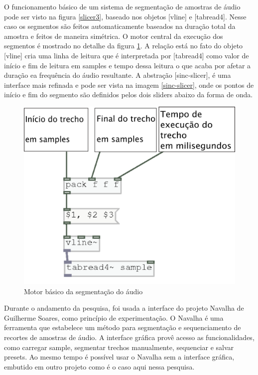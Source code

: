 \documentclass{ppgmus}
\begin{document}
O funcionamento básico de um sistema de segmentação de amostras de áudio pode ser visto na figura \ref{slicer3},
baseado nos objetos [vline\texttildelow] e [tabread4\texttildelow]. Nesse caso os segmentos são feitos
automaticamente baseados na duração total da amostra e feitos de maneira simétrica.
O motor central da execução dos segmentos é mostrado no detalhe da figura \ref{slice-motor}.
A relação está no fato do objeto [vline\texttildelow] cria uma linha de leitura que é interpretada
por [tabread4\texttildelow] como valor de início e fim de leitura em samples e tempo dessa
leitura o que acaba por afetar a duração ea frequência do áudio resultante. 
A abstração [sinc-slicer], é uma interface mais refinada e pode ser vista na imagem \ref{sinc-slicer}, 
onde os pontos de início e fim do segmento são definidos pelos dois sliders abaixo da forma de onda.

\begin{figure}
\includegraphics[scale=.6]{slice-motor}
\caption{Motor básico da segmentação do áudio}
\label{slice-motor}
\end{figure}

Durante o andamento da pesquisa, foi usada a interface do projeto Navalha de Guilherme Soares,
como princípio de experimentação.
O Navalha é uma ferramenta que estabelece
um método para segmentação e sequenciamento de recortes de amostras de áudio. A interface gráfica
provê acesso as funcionalidades, como carregar sample, segmentar trechos manualmente, sequenciar e 
salvar presets. Ao mesmo tempo é possível usar o Navalha sem a interface gráfica, embutido em outro
projeto como é o caso aqui nessa pesquisa.
\end{document}
